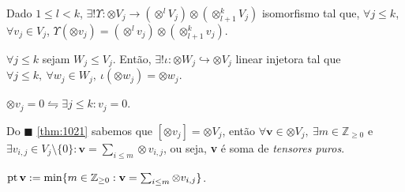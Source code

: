 \begin{proposition}
    \label{prop:1023}
    Dado \(1\leq l < k\), \(\exists ! \Upsilon  : \otimes V_j \to (\otimes^l V_j) \otimes (\otimes_{l+1}^k  V_j)\)  isomorfismo tal que, \(\forall j\leq k\), \(\forall v_j \in V_j\), \(\Upsilon (\otimes v_j )= (\otimes^l v_j) \otimes (\otimes_{l+1}^kv_j)\). 
\end{proposition}


\begin{proposition}
    \(\forall j\leq k\) sejam \(W_j \leq V_j\). Então, \(\exists ! \iota : \otimes W_j \hookrightarrow \otimes V_j\) linear injetora tal que \(\forall j\leq k, \ \forall w_j \in W_j, \ \iota (\otimes w_j) = \otimes w_j\). 
\end{proposition}


\begin{corollary}
    \(\otimes v_j = 0 \leftrightharpoons \exists j\leq k : v_j = 0 \). 
\end{corollary}


\begin{note}
    Do \(\blacksquare\) \ref{thm:1021} sabemos que \([\otimes v_j] = \otimes V_j\), então \(\forall \textbf{v} \in \otimes V_j,\ \exists m \in \mathbb{Z}_{\geq 0}\) e \( \exists v_{i,j} \in V_j \setminus\{0\}: \textbf{v} = \sum_{i\leq m} \otimes v_{i,j} \), ou seja, \textbf{v} é soma de \emph{tensores puros}.   
\end{note}

\begin{definition}
    \centering
    \(\operatorname{pt}\textbf{v} := \min\{m \in \mathbb{Z}_{\geq 0} : \textbf{v} = \sum_{i\leq m} \otimes v_{i,j}\}\). 
\end{definition}

